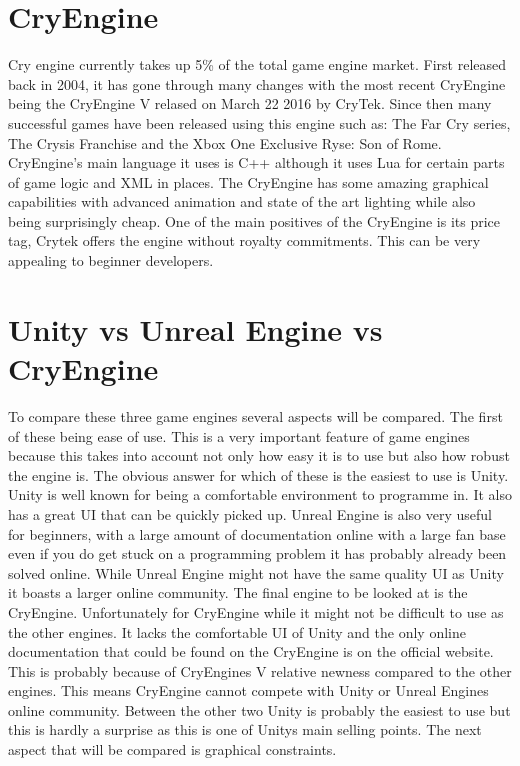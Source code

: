 \documentclass{article}
\begin{document}
\section{CryEngine}
Cry engine currently takes up 5\% of the total game engine market. First released back in 2004, it has gone through many changes with the most recent CryEngine being the CryEngine V relased on March 22 2016 by CryTek. Since then many successful games have been released using this engine such as: The Far Cry series, The Crysis Franchise and the Xbox One Exclusive Ryse: Son of Rome.
\newline CryEngine’s main language it uses is C++ although it uses Lua for certain parts of game logic and XML in places.  The CryEngine has some amazing graphical capabilities with advanced animation and state of the art lighting while also being surprisingly cheap. One of the main positives of the CryEngine is its price tag, Crytek offers the engine without royalty commitments. This can be very appealing to beginner developers.  

\section{Unity vs Unreal Engine vs CryEngine}
To compare these three game engines several aspects will be compared. The first of these being ease of use. This is a very important feature of game engines because this takes into account not only how easy it is to use but also how robust the engine is. The obvious answer for which of these is the easiest to use is Unity. Unity is well known for being a comfortable environment to programme in. It also has a great UI that can be quickly picked up. Unreal Engine is also very useful for beginners, with a large amount of documentation online with a large fan base even if you do get stuck on a programming problem it has probably already been solved online. While Unreal Engine might not have the same quality UI as Unity it boasts a larger online community. The final engine to be looked at is the CryEngine. Unfortunately for CryEngine while it might not be difficult to use as the other engines. It lacks the comfortable UI of Unity and the only online documentation that could be found on the CryEngine is on the official website. This is probably because of CryEngines V relative newness compared to the other engines. This means CryEngine cannot compete with Unity or Unreal Engines online community. Between the other two Unity is probably the easiest to use but this is hardly a surprise as this is one of Unitys main selling points.
\newline
The next aspect that will be compared is graphical constraints.
\end{document}
